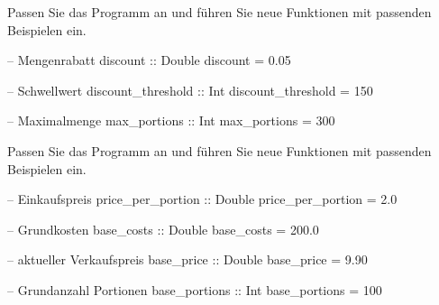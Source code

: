 \begin{frame}[fragile]\onslide<+->%
    \begin{exercise}[c)]
        Passen Sie das Programm an und führen Sie neue Funktionen mit passenden Beispielen ein.
    \end{exercise}\onslide<+->
    \begin{solve}
    \vspace{-\abovedisplayskip}\begin{minipage}[t]{0.5\linewidth}
    \begin{plainhaskell}
-- Mengenrabatt
discount :: Double
discount = 0.05

-- Schwellwert
discount_threshold :: Int
discount_threshold = 150
    \end{plainhaskell}
    \end{minipage}\begin{minipage}[t]{0.5\linewidth}
    \begin{plainhaskell}
-- Maximalmenge
max_portions :: Int
max_portions = 300
    \end{plainhaskell}
    \end{minipage}
    \end{solve}
\end{frame}
\addtocounter{exercise}{-1}\addtocounter{solve}{-1}%
\begin{frame}\onslide<+->%
    \begin{exercise}[c)]
        Passen Sie das Programm an und führen Sie neue Funktionen mit passenden Beispielen ein.
    \end{exercise}
    \begin{solve}
    \vspace{-\abovedisplayskip}\begin{minipage}[t]{0.5\linewidth}
    \begin{plainhaskell}
-- Einkaufspreis
price_per_portion :: Double
price_per_portion = 2.0

-- Grundkosten
base_costs :: Double
base_costs = 200.0
    \end{plainhaskell}
    \end{minipage}\begin{minipage}[t]{0.5\linewidth}
    \begin{plainhaskell}
-- aktueller Verkaufspreis
base_price :: Double
base_price = 9.90

-- Grundanzahl Portionen
base_portions :: Int
base_portions = 100
    \end{plainhaskell}
    \end{minipage}
    \end{solve}
\end{frame}
